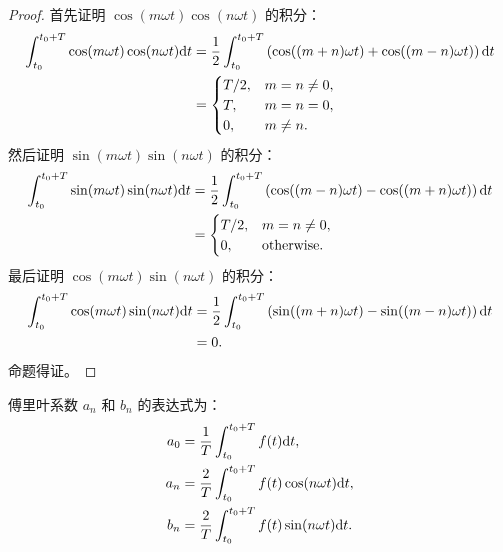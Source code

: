 \begin{proof}
    首先证明 $\cos(m\omega t)\cos(n\omega t)$ 的积分：
    \begin{align*}
        \int_{t_0}^{t_0 + T}\cos(m\omega t)\cos(n\omega t)\mathrm{d}t
        & = \frac{1}{2}\int_{t_0}^{t_0 + T}\left(\cos((m + n)\omega t) + \cos((m - n)\omega t)\right)\mathrm{d}t \\
        & = \begin{cases}
            T / 2, & m = n \neq 0, \\
            T, & m = n = 0, \\
            0, & m \neq n.
        \end{cases}
    \end{align*}
    然后证明 $\sin(m\omega t)\sin(n\omega t)$ 的积分：
    \begin{align*}
        \int_{t_0}^{t_0 + T}\sin(m\omega t)\sin(n\omega t)\mathrm{d}t
        & = \frac{1}{2}\int_{t_0}^{t_0 + T}\left(\cos((m - n)\omega t) - \cos((m + n)\omega t)\right)\mathrm{d}t \\
        & = \begin{cases}
            T / 2, & m = n \neq 0, \\
            0, & \text{otherwise}.
        \end{cases}
    \end{align*}
    最后证明 $\cos(m\omega t)\sin(n\omega t)$ 的积分：
    \begin{align*}
        \int_{t_0}^{t_0 + T}\cos(m\omega t)\sin(n\omega t)\mathrm{d}t
        & = \frac{1}{2}\int_{t_0}^{t_0 + T}\left(\sin((m + n)\omega t) - \sin((m - n)\omega t)\right)\mathrm{d}t \\
        & = 0.
    \end{align*}
    命题得证。
\end{proof}

\begin{corollary}
    傅里叶系数 $a_n$ 和 $b_n$ 的表达式为：
    \begin{align*}
        a_0 & = \frac{1}{T}\int_{t_0}^{t_0 + T}f(t)\mathrm{d}t, \\
        a_n & = \frac{2}{T}\int_{t_0}^{t_0 + T}f(t)\cos(n\omega t)\mathrm{d}t, \\
        b_n & = \frac{2}{T}\int_{t_0}^{t_0 + T}f(t)\sin(n\omega t)\mathrm{d}t.
    \end{align*}
\end{corollary}

